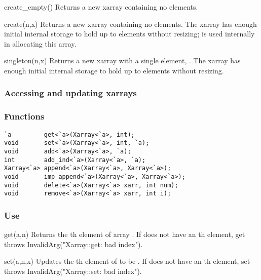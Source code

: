 \begin{defun}{create_empty}{()}
Returns a new xarray containing no elements.
\end{defun}

\begin{defun}{create}{(n,x)}
Returns a new xarray containing no elements.  The xarray has enough
initial internal storage to hold up to  elements without
resizing;  is used internally in allocating this array.
\end{defun}

\begin{defun}{singleton}{(n,x)}
Returns a new xarray with a single element, .  The xarray has
enough initial internal storage to hold up to  elements without
resizing.
\end{defun}

\subsubsection*{Accessing and updating xarrays}
\subsubsection*{Functions}
\begin{verbatim}
`a         get<`a>(Xarray<`a>, int);
void       set<`a>(Xarray<`a>, int, `a);
void       add<`a>(Xarray<`a>, `a);
int        add_ind<`a>(Xarray<`a>, `a);
Xarray<`a> append<`a>(Xarray<`a>, Xarray<`a>);
void       imp_append<`a>(Xarray<`a>, Xarray<`a>);
void       delete<`a>(Xarray<`a> xarr, int num);
void       remove<`a>(Xarray<`a> xarr, int i);
\end{verbatim}

\subsubsection*{Use}

\begin{defun}{get}{(a,n)}
Returns the th element of array .  If  does not
have an th element, get throws InvalidArg("Xarray::get: bad
index").
\end{defun}

\begin{defun}{set}{(a,n,x)}
Updates the th element of  to be .  If  does
not have an th element, set throws InvalidArg("Xarray::set: bad
index").
\end{defun}

